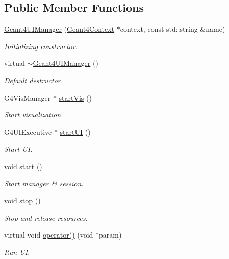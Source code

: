 \subsection*{Public Member Functions}
\begin{DoxyCompactItemize}
\item 
\hyperlink{class_d_d4hep_1_1_simulation_1_1_geant4_u_i_manager_a80b987d5f8456101424ab3c4ac69c08e}{Geant4UIManager} (\hyperlink{class_d_d4hep_1_1_simulation_1_1_geant4_context}{Geant4Context} $\ast$context, const std::string \&name)
\begin{DoxyCompactList}\small\item\em Initializing constructor. \item\end{DoxyCompactList}\item 
virtual \hyperlink{class_d_d4hep_1_1_simulation_1_1_geant4_u_i_manager_af668d960c771504a66490bdf8f0aebd8}{$\sim$Geant4UIManager} ()
\begin{DoxyCompactList}\small\item\em Default destructor. \item\end{DoxyCompactList}\item 
G4VisManager $\ast$ \hyperlink{class_d_d4hep_1_1_simulation_1_1_geant4_u_i_manager_a70ee5c55162faf4f3b77843449c8e799}{startVis} ()
\begin{DoxyCompactList}\small\item\em Start visualization. \item\end{DoxyCompactList}\item 
G4UIExecutive $\ast$ \hyperlink{class_d_d4hep_1_1_simulation_1_1_geant4_u_i_manager_a9992d662309b9d5bcd67fba232801738}{startUI} ()
\begin{DoxyCompactList}\small\item\em Start UI. \item\end{DoxyCompactList}\item 
void \hyperlink{class_d_d4hep_1_1_simulation_1_1_geant4_u_i_manager_af092b336d49fbb7cf68f41b60b4dc88d}{start} ()
\begin{DoxyCompactList}\small\item\em Start manager \& session. \item\end{DoxyCompactList}\item 
void \hyperlink{class_d_d4hep_1_1_simulation_1_1_geant4_u_i_manager_ab6f7bb12343b10b7d5ea19a422ad9718}{stop} ()
\begin{DoxyCompactList}\small\item\em Stop and release resources. \item\end{DoxyCompactList}\item 
virtual void \hyperlink{class_d_d4hep_1_1_simulation_1_1_geant4_u_i_manager_a3b883391f9b66b1620c0ba44406b3247}{operator()} (void $\ast$param)
\begin{DoxyCompactList}\small\item\em Run UI. \item\end{DoxyCompactList}\end{DoxyCompactItemize}
